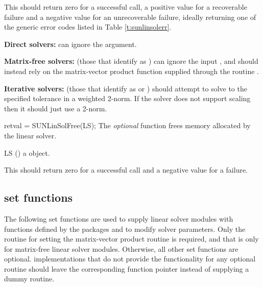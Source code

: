 {
  This should return zero for
  a successful call, a positive value for a recoverable failure and a
  negative value for an unrecoverable failure, ideally returning one
  of the generic error codes listed in Table \ref{t:sunlinsolerr}.
}
{
  {\bf Direct solvers:} can ignore the  argument.

  {\bf Matrix-free solvers:} (those that identify as
  ) can ignore the {\sunmatrix} input
  , and should instead rely on the matrix-vector product
  function supplied through the routine .

  {\bf Iterative solvers:} (those that identify as
   or \newline
  )
  should attempt to solve to the specified tolerance  in a weighted
  2-norm. If the solver does not support scaling then it should just use a
  2-norm.
}
{
  retval = SUNLinSolFree(LS);
}
{
  The \textit{optional} function  frees memory allocated by the linear solver.
}
{
  \begin{args}[LS]
  \item[LS] ()
    a {\sunlinsol} object.
  \end{args}
}
{
  This should return zero for a successful call and a negative value
  for a failure.
}
{}


\subsection{ set functions}\label{ss:sunlinsol_SetFn}

The following set functions are used to supply linear solver modules with
functions defined by the {\sundials} packages and to modify solver
parameters.  Only the routine for setting the matrix-vector product
routine is required, and that is only for matrix-free linear solver
modules.  Otherwise, all other set functions are optional.  {\sunlinsol}
implementations that do not provide the functionality for any optional
routine should leave the corresponding function pointer 
instead of supplying a dummy routine.

